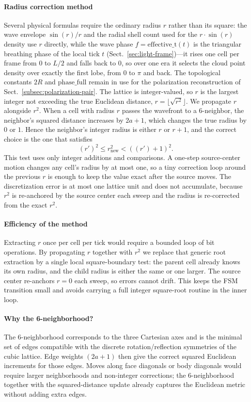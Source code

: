 \documentclass{ijuc}
\begin{document}
\paragraph{Radius correction method}
Several physical formulas require the ordinary radius $r$ rather than its square:
the wave envelope $\sin(r)/r$
and the radial shell count used for the $r\cdot\sin(r)$ density use $r$ directly,
while the wave phase $f=\mathrm{effective\_t}(t)$ is the triangular breathing phase of the local tick $t$ (Sect.~\ref{sec:light-frame})---it rises one cell per frame from $0$ to $L/2$ and falls back to $0$, so over one era it selects the cloud point density over exactly the first lobe, from $0$ to $\pi$ and back.
The topological constants $2R$ and $\mathrm{phase\_full}$ remain in use for the polarization reconstruction of Sect.~\ref{subsec:polarization-pair}.
The lattice is integer-valued, so $r$ is the largest integer not exceeding the true Euclidean distance,
$r=\lfloor\sqrt{r^{2}}\rfloor$.
We propagate $r$ alongside $r^{2}$.
When a cell with radius $r$ passes the wavefront to a 6-neighbor,
the neighbor's squared distance increases by $2a+1$,
which changes the true radius by $0$ or $1$.
Hence the neighbor's integer radius is either $r$ or $r+1$,
and the correct choice is the one that satisfies
\[
(r')^{2}\le r^{2}_{\text{new}}<((r')+1)^{2}.
\]
This test uses only integer additions and comparisons.
A one-step source-center motion changes any cell's radius by at most one,
so a tiny correction loop around the previous $r$ is enough to keep the value exact after the source moves.
The discretization error is at most one lattice unit and does not accumulate,
because $r^{2}$ is re-anchored by the source center each sweep
and the radius is re-corrected from the exact $r^{2}$.
\paragraph{Efficiency of the method}
Extracting $r$ once per cell per tick would require a bounded loop of bit operations.
By propagating $r$ together with $r^{2}$ we replace that generic root extraction
by a single local square-boundary test: the parent cell already knows its own radius,
and the child radius is either the same or one larger.
The source center re-anchors $r=0$ each sweep, so errors cannot drift.
This keeps the FSM transition small and avoids carrying a full integer square-root routine in the inner loop.
\paragraph{Why the 6-neighborhood?}
The 6-neighborhood corresponds to the three Cartesian axes and is the minimal set of edges compatible with the discrete rotation/reflection symmetries of the cubic lattice.  Edge weights $(2a+1)$ then give the correct squared Euclidean increments for those edges.  Moves along face diagonals or body diagonals would require larger neighborhoods and non-integer corrections; the 6-neighborhood together with the squared-distance update already captures the Euclidean metric without adding extra edges.
\end{document}
